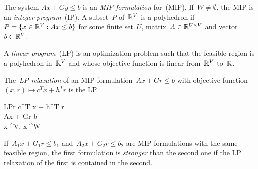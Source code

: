 \documentclass[../main.tex]{subfiles}
\begin{document}
The system ${Ax + Gy \leq b}$ is an \emph{MIP formulation} for~(MIP).
If~$W \neq \emptyset$, the MIP is an \emph{integer program}~(IP).
A subset~$P$ of~$\mathbb{R}^V$ is a polyhedron if~$P = \{x \in \mathbb{R}^V : Ax \leq b\}$ for some finite set~$U$, matrix~${A \in \mathbb{R}^{U \times V}}$ and vector ${b \in \mathbb{R}^V}$.

A \emph{linear program}~(LP) is an optimization problem such that the feasible region is a polyhedron in~$\mathbb{R}^V$ and whose objective function is linear from~$\mathbb{R}^V$ to~$\mathbb{R}$.

The~\emph{LP relaxation} of an MIP formulation~${Ax + Gr \leq b}$ with objective function~${(x, r) \mapsto c^T x + h^T r}$ is the LP
\begin{optimize}{LPr}
	 c^T x + h^T r \\
	 Ax + Gr \leq b \\
	x \in \R^V, x \in \R^W
\end{optimize}

If~${A_1x + G_1r \leq b_1}$ and~${A_2x + G_2r \leq b_2}$ are MIP formulations with the same feasible region, the first formulation is \emph{stronger} than the second one if the LP relaxation of the first is contained in the second.
\end{document}
